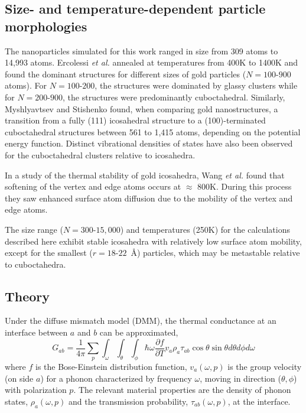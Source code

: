 \subsection{Size- and temperature-dependent particle morphologies}
The nanoparticles simulated for this work ranged in size from 309
atoms to 14,993 atoms.  Ercolessi \textit{et al.}\cite{Ercolessi1991}
annealed at temperatures from 400K to 1400K and found the dominant
structures for different sizes of gold particles
($N = 100 \text{-} 900$ atoms).  For $N = 100 \text{-} 200$, the
structures were dominated by glassy clusters while for
$N = 200 \text{-} 900$, the structures were predominantly
cuboctahedral. Similarly, Myshlyavtsev and Stishenko found, when
comparing gold nanostructures, a transition from a fully (111)
icosahedral structure to a (100)-terminated cuboctahedral structures
between 561 to 1,415 atoms, depending on the potential energy
function.\cite{Myshlyavtsev2013} Distinct vibrational densities of
states have also been observed for the cuboctahedral clusters relative
to icosahedra.\cite{Sauceda2015}

In a study of the thermal stability of gold icosahedra, Wang
\textit{et al.}\cite{Wang2004} found that softening of the vertex and
edge atoms occurs at $\approx$ 800K.  During this process they saw
enhanced surface atom diffusion due to the mobility of the vertex and
edge atoms.

The size range ($N = 300 \text{-} 15,000$) and temperatures (250K) for
the calculations described here exhibit stable icosahedra with
relatively low surface atom mobility, except for the smallest
($r = 18 \text{-} 22$~\AA) particles, which may be metastable relative to
cuboctahedra.

\subsection{Theory}
Under the diffuse mismatch model (DMM), the thermal conductance at an interface between $a$ and $b$ can be approximated,  
\begin{equation}
G_{ab} = \frac{1}{4 \pi} \sum_p \int_\omega \int_\theta \int_\phi \hbar \omega \frac{\partial f}{\partial T}  v_a  \rho_a  \tau_{ab} \cos\theta \sin\theta d\theta d\phi d\omega
\end{equation}
where $f$ is the Bose-Einstein distribution function, $v_a(\omega, p)$
is the group velocity (on side $a$) for a phonon characterized by
frequency $\omega$, moving in direction ($\theta, \phi$) with
polarization $p$.  The relevant material properties are the density of
phonon states, $\rho_a(\omega, p)$ and the transmission probability,
$\tau_{ab}(\omega, p)$, at the
interface.\cite{Swartz:1989uq,Reddy:2005fk,Monachon2016}

